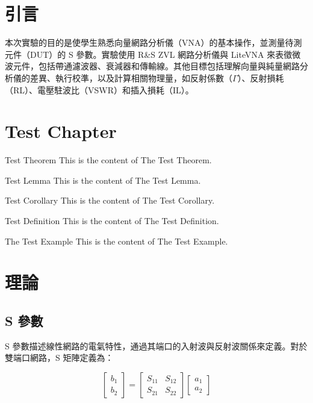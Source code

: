 \documentclass[ paper=a4paper, 12pt]{article}
\begin{document}



\section{引言}
本次實驗的目的是使學生熟悉向量網路分析儀（VNA）的基本操作，並測量待測元件（DUT）的 S 參數。實驗使用 R\&S ZVL 網路分析儀與 LiteVNA 來表徵微波元件，包括帶通濾波器、衰減器和傳輸線。其他目標包括理解向量與純量網路分析儀的差異、執行校準，以及計算相關物理量，如反射係數（\(\Gamma\)）、反射損耗（RL）、電壓駐波比（VSWR）和插入損耗（IL）。
\section{Test Chapter}
		\begin{Thm}{Test Theorem}{}
			This is the content of The Test Theorem.
		\end{Thm}
		\begin{Lem}{Test Lemma}{}
			This is the content of The Test Lemma.
		\end{Lem}
		\begin{Cor}{Test Corollary}{}
			This is the content of The Test Corollary.
		\end{Cor}
		\begin{Def}{Test Definition}{}
			This is the content of The Test Definition.
		\end{Def}
		\begin{Exp}{The Test Example}{}
		 This is the content of The Test Example.
		\end{Exp}
\section{理論}
\subsection{S 參數}
S 參數描述線性網路的電氣特性，通過其端口的入射波與反射波關係來定義。對於雙端口網路，S 矩陣定義為：

\[
\begin{bmatrix}
b_1 \\
b_2
\end{bmatrix}
=
\begin{bmatrix}
S_{11} & S_{12} \\
S_{21} & S_{22}
\end{bmatrix}
\begin{bmatrix}
a_1 \\
a_2
\end{bmatrix}
\]
\end{document}
